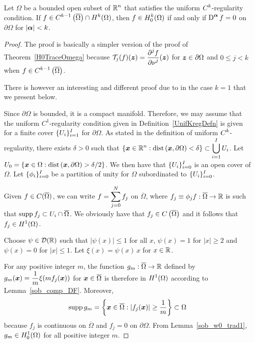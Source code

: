 \begin{prop} \label{sob_w0_trad2}
Let $\Omega$ be a bounded open subset of
$\displaystyle \mathbb{R}^n$ that satisfies the uniform
$\displaystyle C^k$-regularity condition.  If
$\displaystyle f \in C^{k-1}\left(\overline{\Omega}\right) \cap H^k(\Omega)$,
then
$\displaystyle f \in H^k_0(\Omega)$ if and only if
$\displaystyle \operatorname{D}^{{\bm{\alpha}}} f =0$ on $\partial \Omega$ for
$|{\bm{\alpha}}|<k$.
\end{prop}

\begin{proof}
The proof is basically a simpler version of the proof
of Theorem~\ref{H0TraceOmega} because
$\displaystyle \mathcal{T}_j(f)({\bm{z}}) = \frac{\displaystyle \partial^{j}{f}} {\displaystyle \partial \nu^{j}}({\bm{z}})$ for
${\bm{z}} \in \partial \Omega$ and $0 \leq j < k$ when
$\displaystyle f \in C^{k-1}\left(\overline{\Omega}\right)$.

There is however an interesting and different proof due to \cite{Br}
in the case $k=1$ that we present below.

Since $\partial \Omega$ is bounded, it is a compact manifold.
Therefore, we may assume that the uniform $C^1$-regularity condition
given in Definition~\ref{UnifKregDefn} is
given for a finite cover
$\displaystyle \{ U_i \}_{i=1}^I$ for $\partial \Omega$.
As stated in the definition of uniform $\displaystyle C^k$-regularity,
there exists $\delta>0$ such that
$\displaystyle \left\{ {\bm{x}} \in \mathbb{R}^n :
\mathrm{dist}\left({\bm{x}},\partial \Omega\right)  < \delta \right\} \subset
\bigcup_{i=1}^I U_i$.
Let $\displaystyle U_0 = \left\{ {\bm{x}} \in \Omega :
\mathrm{dist}\left({\bm{x}},\partial \Omega\right)  > \delta/2 \right\}$.
We then have that $\displaystyle \{ U_i \}_{i=0}^I$ is an open cover of
$\Omega$.
Let $\displaystyle \{ \phi_i \}_{i=0}^I$ be a partition of unity for
$\Omega$ subordinated to $\displaystyle \{ U_i \}_{i=0}^I$.

Given $\displaystyle f \in C(\overline{\Omega})$, we can write 
$\displaystyle f = \sum_{j=0}^N f_j$ on $\overline{\Omega}$,
where $f_j \equiv \phi_j f :\overline{\Omega} \rightarrow \mathbb{R}$ is such that
$\operatorname{supp} f_j \subset U_i \cap \overline{\Omega}$.
We obviously have that $\displaystyle f_j \in C\left(\overline{\Omega}\right)$
and it follows that $\displaystyle f_j \in H^1(\Omega)$.

\stage{$\mathbf{\Leftarrow}$}
Choose $\displaystyle \psi \in \mathcal{D}(\mathbb{R})$ such that
$|\psi(x)|\leq 1$ for all $x$, $\psi(x) = 1$ for $|x|\geq 2$ and
$\psi(x) = 0$ for $|x|\leq 1$.  Let
$\xi(x) = \psi(x)\,x$ for $x \in \mathbb{R}$.

For any positive integer $m$, the function
$g_m:\overline{\Omega}\rightarrow \mathbb{R}$ defined
by $\displaystyle g_m({\bm{x}}) = \frac{1}{m}\xi(mf_j({\bm{x}}))$ for
${\bm{x}}\in \overline{\Omega}$ is therefore in $\displaystyle H^1(\Omega)$
according to Lemma~\ref{sob_comp_DF}.  Moreover,
\[
\operatorname{supp} g_m = \left\{ {\bm{x}} \in \overline{\Omega} : |f_j({\bm{x}})| \geq \frac{1}{m}
\right\} \subset \Omega
\]
because $f_j$ is continuous on $\overline{\Omega}$ and $f_j = 0$ on
$\partial \Omega$.  From Lemma~\ref{sob_w0_trad1},
$\displaystyle g_m \in H^1_0(\Omega)$ for all positive integer $m$.


\end{proof}
